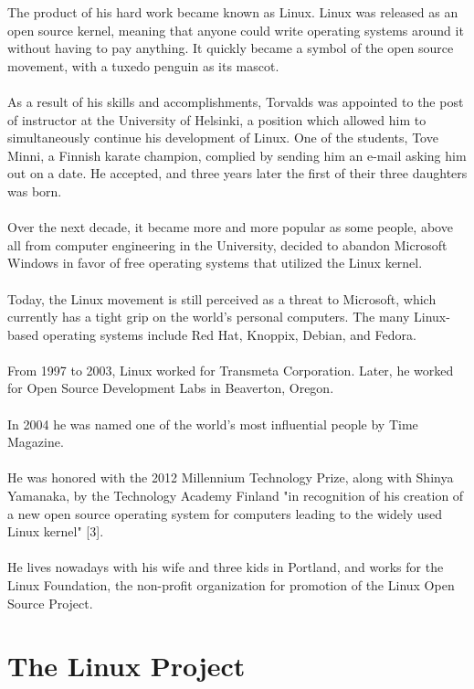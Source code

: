 \documentclass[11pt]{article}
\begin{document}
The product of his hard work became known as Linux.
Linux was released as an open source kernel, meaning that anyone could write operating systems around it without having to pay anything. It quickly became a symbol of the open source movement, with a tuxedo penguin as its mascot.\\
\\
As a result of his skills and accomplishments, Torvalds was appointed to the post of instructor at the University of Helsinki, a position which allowed him to simultaneously continue his development of Linux. One of the students, Tove Minni, a Finnish karate champion, complied by sending him an e-mail asking him out on a date. He accepted, and three years later the first of their three daughters was born.\\
\\
Over the next decade, it became more and more popular as some people, above all from computer engineering in the University, decided to abandon Microsoft Windows in favor of free operating systems that utilized the Linux kernel.\\
\\
Today, the Linux movement is still perceived as a threat to Microsoft, which currently has a tight grip on the world's personal computers. The many Linux-based operating systems include Red Hat, Knoppix, Debian, and Fedora.\\
\\
From 1997 to 2003, Linux worked for Transmeta Corporation. Later, he worked for Open Source Development Labs in Beaverton, Oregon.\\
\\
In 2004 he was named one of the world's most influential people by Time Magazine.\\
\\
He was honored with the 2012 Millennium Technology Prize, along with Shinya Yamanaka, by the Technology Academy Finland "in recognition of his creation of a new open source operating system for computers leading to the widely used Linux kernel" [3].\\
\\
He lives nowadays with his wife and three kids in Portland, and works for the Linux Foundation, the non-profit organization for promotion of the Linux Open Source Project.

\section{The Linux Project}
\end{document}
